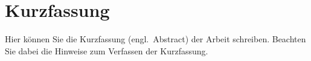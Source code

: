 \chapter*{Kurzfassung}

Hier können Sie die Kurzfassung (engl.~Abstract) der Arbeit schreiben. Beachten Sie dabei die Hinweise zum Verfassen der Kurzfassung.


